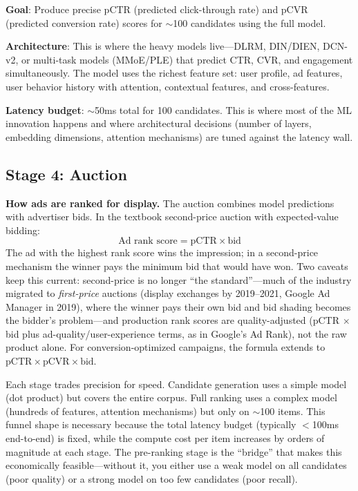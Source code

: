 \textbf{Goal}: Produce precise pCTR (predicted click-through rate) and pCVR (predicted conversion rate) scores for $\sim$100 candidates using the full model.

\textbf{Architecture}: This is where the heavy models live---DLRM, DIN/DIEN, DCN-v2, or multi-task models (MMoE/PLE) that predict CTR, CVR, and engagement simultaneously. The model uses the richest feature set: user profile, ad features, user behavior history with attention, contextual features, and cross-features.

\textbf{Latency budget}: $\sim$50ms total for 100 candidates. This is where most of the ML innovation happens and where architectural decisions (number of layers, embedding dimensions, attention mechanisms) are tuned against the latency wall.

\subsection{Stage 4: Auction}

\textbf{How ads are ranked for display.} The auction combines model predictions with advertiser bids. In the textbook second-price auction with expected-value bidding:
\begin{equation}
\text{Ad rank score} = \text{pCTR} \times \text{bid}
\end{equation}
The ad with the highest rank score wins the impression; in a second-price mechanism the winner pays the minimum bid that would have won. Two caveats keep this current: second-price is no longer ``the standard''---much of the industry migrated to \textit{first-price} auctions (display exchanges by 2019--2021, Google Ad Manager in 2019), where the winner pays their own bid and bid shading becomes the bidder's problem---and production rank scores are quality-adjusted (pCTR $\times$ bid plus ad-quality/user-experience terms, as in Google's Ad Rank), not the raw product alone. For conversion-optimized campaigns, the formula extends to $\text{pCTR} \times \text{pCVR} \times \text{bid}$.

\begin{keyinsight}
Each stage trades precision for speed. Candidate generation uses a simple model (dot product) but covers the entire corpus. Full ranking uses a complex model (hundreds of features, attention mechanisms) but only on $\sim$100 items. This funnel shape is necessary because the total latency budget (typically $<$100ms end-to-end) is fixed, while the compute cost per item increases by orders of magnitude at each stage. The pre-ranking stage is the ``bridge'' that makes this economically feasible---without it, you either use a weak model on all candidates (poor quality) or a strong model on too few candidates (poor recall).
\end{keyinsight}


